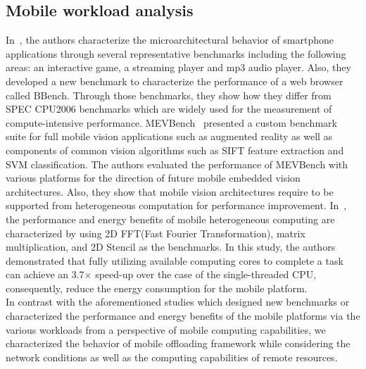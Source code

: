 \documentclass[conference]{IEEEtran}
\begin{document}
\subsection{Mobile workload analysis}
In~\cite{fullsystem}, the authors characterize the microarchitectural
behavior of smartphone applications through several representative
benchmarks including the following areas: an interactive game, a
streaming player and mp3 audio player.
%
Also, they developed a new benchmark to characterize the performance 
of a web browser called BBench.
%
Through those benchmarks, they show how they differ from SPEC CPU2006
benchmarks which are widely used for the measurement of compute-intensive
performance.
%
MEVBench~\cite{mevbench} presented a custom benchmark suite for full mobile
vision applications such as augmented reality as well as components of
common vision algorithms such as SIFT feature extraction and SVM
classification.
%
The authors evaluated the performance of MEVBench with various
platforms for the direction of future mobile embedded vision
architectures.
%
Also, they show that mobile vision architectures require to be supported
from heterogeneous computation for performance improvement.
%
In~\cite{characterization}, the performance and energy benefits of
mobile heterogeneous computing are characterized by using 2D FFT(Fast
Fourier Transformation), matrix multiplication, and 2D Stencil as the
benchmarks.
%
In this study, the authors demonstrated that fully utilizing available
computing cores to complete a task can achieve an 3.7$\times$ speed-up
over the case of the single-threaded CPU, consequently, reduce the
energy consumption for the mobile platform.\\
%
\indent In contrast with the aforementioned studies which designed new
benchmarks or characterized the performance and energy benefits of
the mobile platforms via the various workloads from a perspective of
mobile computing capabilities, we characterized the behavior of mobile
offloading framework while considering the network conditions as well as
the computing capabilities of remote resources.
%
\end{document}
